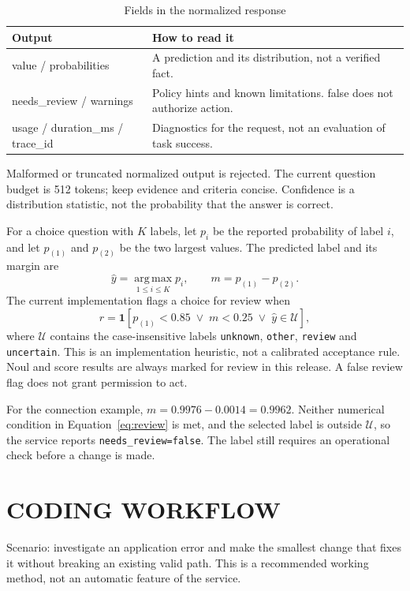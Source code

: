 \documentclass[10pt,a4paper]{article}
\begin{document}
\begin{table}[H]
\centering\small
\renewcommand{\arraystretch}{1.15}
\begin{tabularx}{\linewidth}{@{}YY@{}}
\toprule
\textbf{Output} & \textbf{How to read it} \\
\midrule
value / probabilities & A prediction and its distribution, not a verified fact. \\
needs\_review / warnings & Policy hints and known limitations. false does not authorize action. \\
usage / duration\_ms / trace\_id & Diagnostics for the request, not an evaluation of task success. \\
\bottomrule
\end{tabularx}
\caption{Fields in the normalized response}
\end{table}
Malformed or truncated normalized output is rejected. The current question budget is 512 tokens; keep evidence and criteria concise. Confidence is a distribution statistic, not the probability that the answer is correct. \cite{r4}


For a choice question with $K$ labels, let $p_i$ be the reported probability of label $i$, and let $p_{(1)}$ and $p_{(2)}$ be the two largest values. The predicted label and its margin are
\begin{equation}
 \hat{y}=\operatorname*{arg\,max}_{1\le i\le K}p_i,
 \qquad m=p_{(1)}-p_{(2)}.
 \label{eq:choice}
\end{equation}
The current implementation flags a choice for review when
\begin{equation}
 r=\mathbf{1}\!\left[
 p_{(1)}<0.85\;\lor\;m<0.25\;\lor\;\hat{y}\in\mathcal{U}
 \right],
 \label{eq:review}
\end{equation}
where $\mathcal{U}$ contains the case-insensitive labels \texttt{unknown}, \texttt{other}, \texttt{review} and \texttt{uncertain}. This is an implementation heuristic, not a calibrated acceptance rule. Noul and score results are always marked for review in this release. A false review flag does not grant permission to act.

For the connection example, $m=0.9976-0.0014=0.9962$. Neither numerical condition in Equation~\eqref{eq:review} is met, and the selected label is outside $\mathcal{U}$, so the service reports \texttt{needs\_review=false}. The label still requires an operational check before a change is made.

\section{CODING WORKFLOW}
Scenario: investigate an application error and make the smallest change that fixes it without breaking an existing valid path. This is a recommended working method, not an automatic feature of the service.
\end{document}
